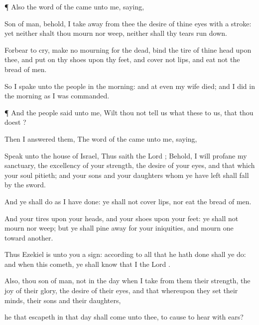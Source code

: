 {\par }{\PP {}¶ Also the
word of the
{} came unto me,
saying,

Son of
man, behold, I take
away from thee the
desire of thine
eyes with a
stroke: yet neither shalt thou
mourn nor
weep, neither shall thy
tears run
down.

Forbear to
cry,
make no
mourning for the
dead,
bind the tire of thine
head upon thee, and put
on thy
shoes upon thy
feet, and
cover not
{}
lips, and
eat not the
bread of
men.

So I
spake unto the
people in the
morning: and at
even my
wife
died; and I
did in the
morning as I was
commanded.


\par }{\PP {}¶ And the
people
said unto me, Wilt thou not
tell us what these
{} to us, that thou
doest
{}?

Then I
answered them, The
word of the
{} came unto me,
saying,

Speak unto the
house of
Israel, Thus
saith the
Lord
{}; Behold, I will
profane my
sanctuary, the
excellency of your
strength, the
desire of your
eyes, and that which your
soul
pitieth; and your
sons and your
daughters whom ye have
left shall
fall by the
sword.

And ye shall
do as I have
done: ye shall not
cover
{}
lips, nor
eat the
bread of
men.

And your
tires
{} upon your
heads, and your
shoes upon your
feet: ye shall not
mourn nor
weep; but ye shall pine
away for your
iniquities, and
mourn
one toward
another.

Thus
Ezekiel is unto you a
sign: according to all that he hath
done shall ye
do: and when this
cometh, ye shall
know that I
{} the
Lord
{}.

Also, thou
son of
man,
{} not
{} in the
day when I
take from them their
strength, the
joy of their
glory, the
desire of their
eyes, and that whereupon they
set their
minds, their
sons and their
daughters,

 he that
escapeth in that
day shall
come unto thee, to cause
{} to
hear
{} with
{}
ears?

}

